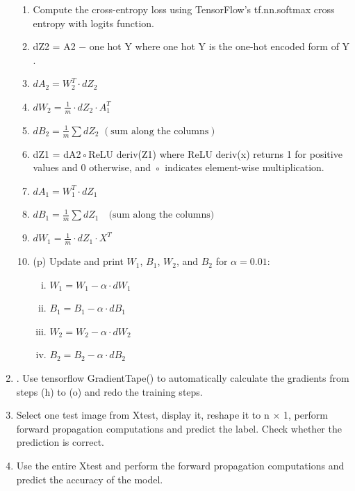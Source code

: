 \begin{enumerate}
\begin{enumerate}
        \item Compute the cross-entropy loss using TensorFlow’s tf.nn.softmax cross entropy with logits
function.

        \item  dZ2 = A2 − one hot Y where one hot Y is the one-hot encoded form of Y .

        \item $dA_2 = W_2^T \cdot dZ_2$


        \item $dW_2 = \frac{1}{m} \cdot dZ_2 \cdot A_1^T$


        \item $dB_2 = \frac{1}{m} \sum dZ_2 \,\, (\text{sum along the columns})$
 

        \item dZ1 = dA2◦ReLU deriv(Z1) where ReLU deriv(x) returns 1 for positive values
and 0 otherwise, and ◦ indicates element-wise multiplication.

        \item $dA_1 = W_1^T \cdot dZ_1$

        \item $dB_1 = \frac{1}{m} \sum dZ_1 \quad \text{(sum along the columns)}$

        \item $dW_1 = \frac{1}{m} \cdot dZ_1 \cdot X^T$

        \item (p) Update and print $W_1$, $B_1$, $W_2$, and $B_2$ for $\alpha = 0.01$:
            \begin{enumerate}[i.]
                \item $W_1 = W_1 - \alpha \cdot dW_1$
                \item $B_1 = B_1 - \alpha \cdot dB_1$
                \item $W_2 = W_2 - \alpha \cdot dW_2$
                \item $B_2 = B_2 - \alpha \cdot dB_2$
            \end{enumerate}
       \end{enumerate}

       \item . Use tensorflow GradientTape() to automatically calculate the gradients from steps
(h) to (o) and redo the training steps.

        \item Select one test image from Xtest, display it, reshape it to n × 1, perform forward
propagation computations and predict the label. Check whether the prediction is
correct.

    \item Use the entire Xtest and perform the forward propagation computations and predict
the accuracy of the model.

\end{enumerate}

